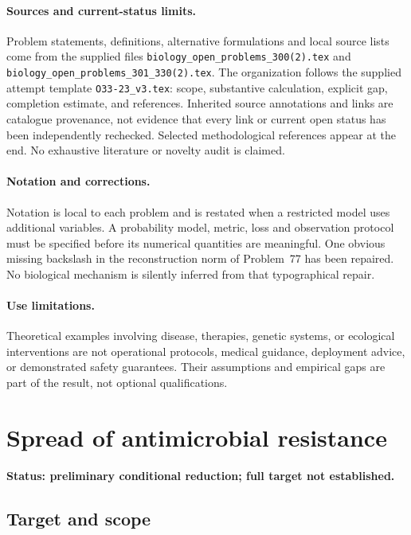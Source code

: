 \documentclass[11pt]{article}
\begin{document}
\paragraph{Sources and current-status limits.}
Problem statements, definitions, alternative formulations and local source lists
come from the supplied files
\texttt{biology\_open\_problems\_300(2).tex} and
\texttt{biology\_open\_problems\_301\_330(2).tex}.
The organization follows the supplied attempt template
\texttt{O33-23\_v3.tex}: scope, substantive calculation, explicit gap,
completion estimate, and references. Inherited source annotations and links are
catalogue provenance, not evidence that every link or current open status has
been independently rechecked. Selected methodological references appear at the
end. No exhaustive literature or novelty audit is claimed.

\paragraph{Notation and corrections.}
Notation is local to each problem and is restated when a restricted model uses
additional variables. A probability model, metric, loss and observation protocol
must be specified before its numerical quantities are meaningful. One obvious
missing backslash in the reconstruction norm of Problem~77 has been repaired.
No biological mechanism is silently inferred from that typographical repair.

\paragraph{Use limitations.}
Theoretical examples involving disease, therapies, genetic systems, or ecological
interventions are not operational protocols, medical guidance, deployment advice,
or demonstrated safety guarantees. Their assumptions and empirical gaps are part
of the result, not optional qualifications.


\section*{Spread of antimicrobial resistance}
\label{prob:215}
\noindent\textbf{Status: preliminary conditional reduction; full target not established.}
\subsection{Target and scope}
\end{document}
